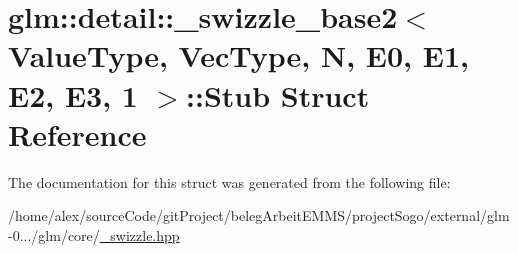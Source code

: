 \hypertarget{structglm_1_1detail_1_1__swizzle__base2_3_01ValueType_00_01VecType_00_01N_00_01E0_00_01E1_00_01E2_00_01E3_00_011_01_4_1_1Stub}{\section{glm\-:\-:detail\-:\-:\-\_\-swizzle\-\_\-base2$<$ Value\-Type, Vec\-Type, N, E0, E1, E2, E3, 1 $>$\-:\-:Stub Struct Reference}
\label{structglm_1_1detail_1_1__swizzle__base2_3_01ValueType_00_01VecType_00_01N_00_01E0_00_01E1_00_01E2_00_01E3_00_011_01_4_1_1Stub}
}


The documentation for this struct was generated from the following file\-:\begin{DoxyCompactItemize}
\item 
/home/alex/source\-Code/git\-Project/beleg\-Arbeit\-E\-M\-M\-S/project\-Sogo/external/glm-\/0.../glm/core/\hyperlink{__swizzle_8hpp}{\-\_\-swizzle.\-hpp}\end{DoxyCompactItemize}
